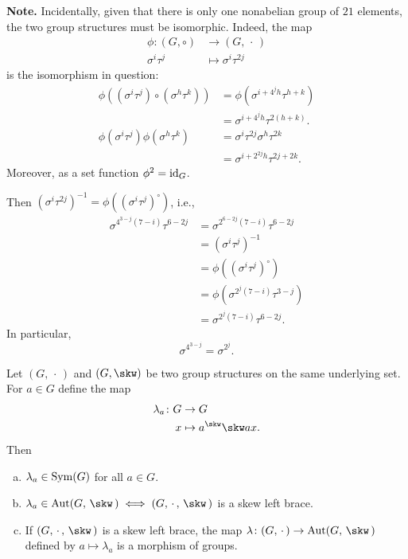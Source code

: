 \begin{xmpls}
\begin{enumerate}[a),font=\upshape]
    \textbf{Note.} Incidentally, given that there is only one nonabelian group of $21$ elements, the two group structures must be isomorphic. Indeed, the map
    \begin{align*}
        \phi\colon (G,\circ)&\to(G,\,\cdot\,)\\
            \sigma^i\tau^j&\mapsto\sigma^i\tau^{2j}
    \end{align*}
    is the isomorphism in question:
    \begin{align*}
        \phi((\sigma^i\tau^j)\circ(\sigma^h\tau^k))
            &= \phi(\sigma^{i+4^jh}\tau^{h+k})\\
            &= \sigma^{i+4^jh}\tau^{2(h+k)}.\\
        \phi(\sigma^i\tau^j)\phi(\sigma^h\tau^k)
            &=\sigma^i\tau^{2j}\sigma^h\tau^{2k}\\
            &= \sigma^{i+2^{2j}h}\tau^{2j+2k}.
    \end{align*}
    Moreover, as a set function $\phi^2=\operatorname{id}_G$.
    
    Then $(\sigma^i\tau^{2j})^{-1}=\phi((\sigma^i\tau^j)^\circ)$, i.e.,
    \begin{align*}
        \sigma^{4^{3-j}(7-i)}\tau^{6-2j}
            &= \sigma^{2^{6-2j}(7-i)}\tau^{6-2j}\\
            &= (\sigma^i\tau^j)^{-1}\\
            &= \phi((\sigma^i\tau^j)^\circ)\\
            &= \phi(\sigma^{2^j(7-i)}\tau^{3-j})\\
            &= \sigma^{2^j(7-i)}\tau^{6-2j}.
    \end{align*}
    In particular,
    \begin{equation}\label{eq:G21-equation}
        \sigma^{4^{3-j}}=\sigma^{2^j}.
    \end{equation}
\end{enumerate}
\end{xmpls}

\begin{lem}\label{lem:ybe-lambda}
    Let\/ $(G,\,\cdot\,)$ and\/ $(G,\skw)$ be two group structures on the same underlying set. For\/ $a\in G$ define the map
    \begin{align}\label{map:lambda}
        \lambda_a\colon G&\to G\\
        x&\mapsto a^\skw\skw ax.\nonumber
    \end{align}
    Then
    \begin{enumerate}[a),font=\upshape]
        \item $\lambda_a\in{\rm Sym}(G)$ for all\/ $a\in G$.
        \item $\lambda_a\in\Aut(G,\,\skw\,)\iff (G,\,\cdot\,,\,\skw\,)$ is a skew left brace.
        \item If\/ $(G,\,\cdot\,,\,\skw\,)$ is a skew left brace, the map\/ $\lambda\colon(G,\,\cdot\,)\to\Aut(G,\,\skw\,)$ defined by\/ $a\mapsto\lambda_a$ is a morphism of groups.
    \end{enumerate}
\end{lem}

